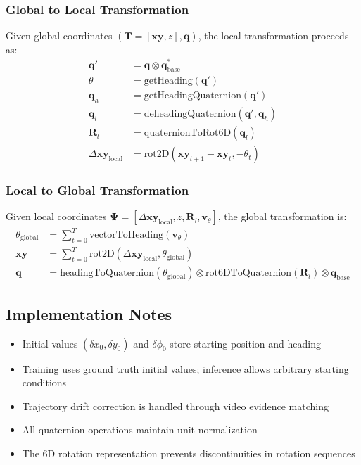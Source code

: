 \subsubsection*{Global to Local Transformation}
Given global coordinates $(\mathbf{T} = [\mathbf{xy}, z], \mathbf{q})$, the local transformation proceeds as:
\begin{align}
    \mathbf{q}' &= \mathbf{q} \otimes \mathbf{q}_{\text{base}}^* \\
    \theta &= \text{getHeading}(\mathbf{q}') \\
    \mathbf{q}_h &= \text{getHeadingQuaternion}(\mathbf{q}') \\
    \mathbf{q}_l &= \text{deheadingQuaternion}(\mathbf{q}', \mathbf{q}_h) \\
    \mathbf{R}_l &= \text{quaternionToRot6D}(\mathbf{q}_l) \\
    \Delta\mathbf{xy}_{\text{local}} &= \text{rot2D}(\mathbf{xy}_{t+1} - \mathbf{xy}_t, -\theta_t)
\end{align}

\subsubsection*{Local to Global Transformation}
Given local coordinates $\mathbf{\Psi} = [\Delta\mathbf{xy}_{\text{local}}, z, \mathbf{R}_l, \mathbf{v}_{\theta}]$, the global transformation is:
\begin{align}
    \theta_{\text{global}} &= \sum_{t=0}^T \text{vectorToHeading}(\mathbf{v}_{\theta}) \\
    \mathbf{xy} &= \sum_{t=0}^T \text{rot2D}(\Delta\mathbf{xy}_{\text{local}}, \theta_{\text{global}}) \\
    \mathbf{q} &= \text{headingToQuaternion}(\theta_{\text{global}}) \otimes \text{rot6DToQuaternion}(\mathbf{R}_l) \otimes \mathbf{q}_{\text{base}}
\end{align}

\subsection*{Implementation Notes}
\begin{itemize}
    \item Initial values $(\delta x_0, \delta y_0)$ and $\delta\phi_0$ store starting position and heading
    \item Training uses ground truth initial values; inference allows arbitrary starting conditions
    \item Trajectory drift correction is handled through video evidence matching
    \item All quaternion operations maintain unit normalization
    \item The 6D rotation representation prevents discontinuities in rotation sequences
\end{itemize}


% 


